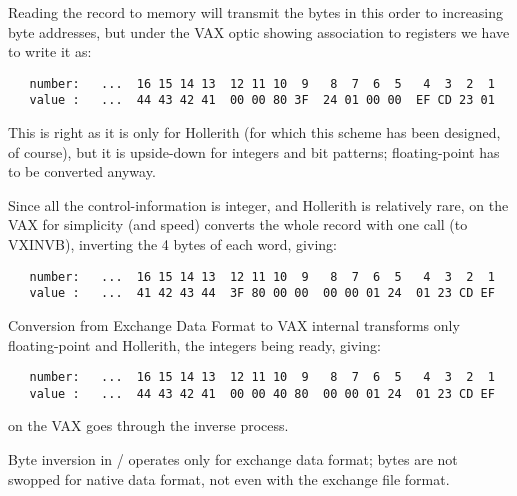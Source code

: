 Reading the record to memory will transmit the bytes in this
order to increasing byte addresses, but under the VAX optic
showing association to registers we have to write it as:

\begin{verbatim}
   number:   ...  16 15 14 13  12 11 10  9   8  7  6  5   4  3  2  1
   value :   ...  44 43 42 41  00 00 80 3F  24 01 00 00  EF CD 23 01
\end{verbatim}

This is right as it is only for Hollerith
(for which this scheme has been designed, of course),
but it is upside-down for integers and bit patterns;
floating-point has to be converted anyway.

Since all the control-information is integer,
and Hollerith is relatively rare,
 on the VAX for simplicity (and speed)
converts the whole record with one call (to VXINVB),
inverting the 4 bytes of each word, giving:

\begin{verbatim}
   number:   ...  16 15 14 13  12 11 10  9   8  7  6  5   4  3  2  1
   value :   ...  41 42 43 44  3F 80 00 00  00 00 01 24  01 23 CD EF
\end{verbatim}

Conversion from Exchange Data Format to VAX internal
transforms only floating-point and Hollerith,
the integers being ready, giving:

\begin{verbatim}
   number:   ...  16 15 14 13  12 11 10  9   8  7  6  5   4  3  2  1
   value :   ...  44 43 42 41  00 00 40 80  00 00 01 24  01 23 CD EF
\end{verbatim}

 on the VAX goes through the inverse process.

Byte inversion in / operates only for exchange data format;
bytes are not swopped for native data format, not even with the
exchange file format.

\endinput

